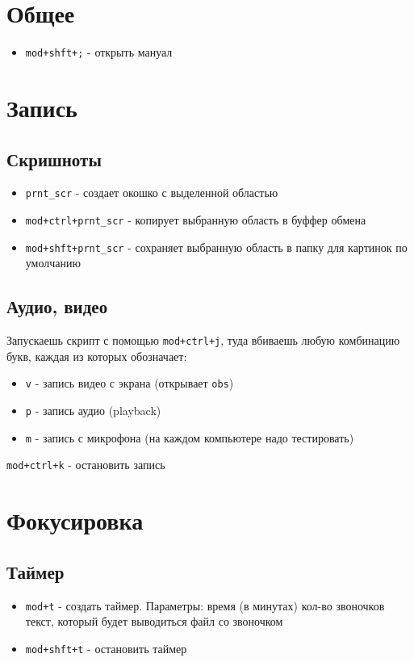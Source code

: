 \documentclass{article}
\begin{document}
\tableofcontents
\newpage
\section{Общее}
\begin{itemize}
    \item \verb|mod+shft+;| - открыть мануал
\end{itemize}

\section{Запись}
\subsection{Скришноты}
\begin{itemize}
    \item \verb|prnt_scr| - создает окошко с выделенной областью
    \item \verb|mod+ctrl+prnt_scr| - копирует выбранную область в буффер
        обмена
    \item \verb|mod+shft+prnt_scr| - сохраняет выбранную область в папку
        для картинок по умолчанию
\end{itemize}

\subsection{Аудио, видео}
Запускаешь скрипт с помощью \verb|mod+ctrl+j|, туда вбиваешь любую
комбинацию букв, каждая из которых обозначает:
\begin{itemize}
    \item \verb|v| - запись видео с экрана (открывает \verb|obs|)
    \item \verb|p| - запись аудио (playback)
    \item \verb|m| - запись с микрофона (на каждом компьютере надо
        тестировать)
\end{itemize}
\verb|mod+ctrl+k| - остановить запись

\section{Фокусировка}
\subsection{Таймер}
\begin{itemize}
    \item \verb|mod+t| - создать таймер. Параметры:
        \subitem *время (в минутах)
        \subitem *кол-во звоночков
        \subitem текст, который будет выводиться
        \subitem файл со звоночком
    \item \verb|mod+shft+t| - остановить таймер
\end{itemize}
\end{document}
